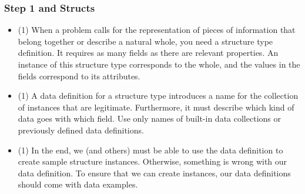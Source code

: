 \documentclass{beamer}
\begin{document}
\begin{frame}
  \frametitle{Step 1 and Structs}
  \begin{itemize}
  \item<2-> (1) When a problem calls for the representation of pieces of information that belong together or describe a natural whole, you need a structure type definition. It requires as many fields as there are relevant properties. An instance of this structure type corresponds to the whole, and the values in the fields correspond to its attributes.
  \item<3-> (1) A data definition for a structure type introduces a name for the collection of instances that are legitimate. Furthermore, it must describe which kind of data goes with which field. Use only names of built-in data collections or previously defined data definitions.
  \item<3-> (1) In the end, we (and others) must be able to use the data definition to create sample structure instances. Otherwise, something is wrong with our data definition. To ensure that we can create instances, our data definitions should come with data examples.
  \end{itemize}
\end{frame}




\end{document}
